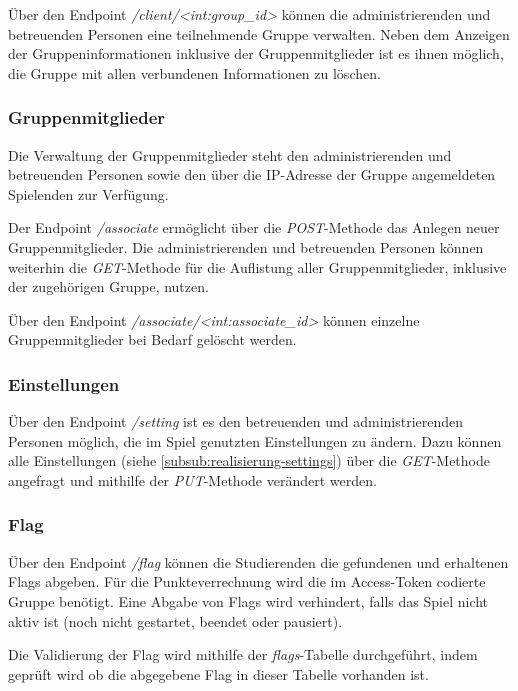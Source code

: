 Über den Endpoint \textit{/client/<int:group\_id>} können die administrierenden und betreuenden Personen eine teilnehmende Gruppe verwalten. Neben dem Anzeigen der Gruppeninformationen inklusive der Gruppenmitglieder ist es ihnen möglich, die Gruppe mit allen verbundenen Informationen zu löschen.

\subsubsection{Gruppenmitglieder}
Die Verwaltung der Gruppenmitglieder steht den administrierenden und betreuenden Personen sowie den über die IP-Adresse der Gruppe angemeldeten Spielenden zur Verfügung.

Der Endpoint \textit{/associate} ermöglicht über die \textit{POST}-Methode das Anlegen neuer Gruppenmitglieder. Die administrierenden und betreuenden Personen können weiterhin die \textit{GET}-Methode für die Auflistung aller Gruppenmitglieder, inklusive der zugehörigen Gruppe, nutzen.

Über den Endpoint \textit{/associate/<int:associate\_id>} können einzelne Gruppenmitglieder bei \linebreak Bedarf gelöscht werden.

\subsubsection{Einstellungen}
Über den Endpoint \textit{/setting} ist es den betreuenden und administrierenden Personen möglich, die im Spiel genutzten Einstellungen zu ändern. Dazu können alle Einstellungen (siehe \autoref{subsub:realisierung-settings}) über die \textit{GET}-Methode angefragt und mithilfe der \textit{PUT}-Methode verändert \linebreak werden.

\subsubsection{Flag}
Über den Endpoint \textit{/flag} können die Studierenden die gefundenen und erhaltenen Flags \linebreak abgeben. Für die Punkteverrechnung wird die im Access-Token codierte Gruppe benötigt. Eine Abgabe von Flags wird verhindert, falls das Spiel nicht aktiv ist (noch nicht gestartet, beendet oder pausiert).

Die Validierung der Flag wird mithilfe der \textit{flags}-Tabelle durchgeführt, indem geprüft wird ob die abgegebene Flag in dieser Tabelle vorhanden ist.

